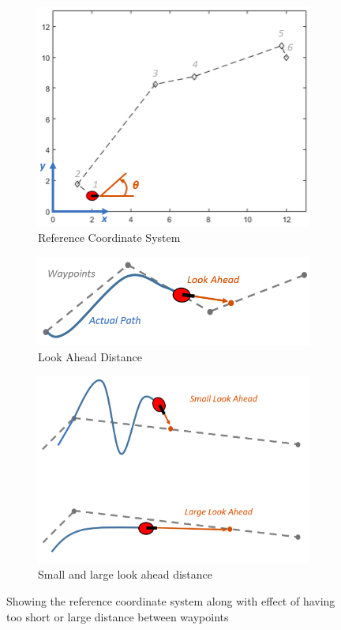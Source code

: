 \documentclass{article}
\begin{document}
		\begin{figure}[!h]
		\centering
		\begin{subfigure}[b]{0.3\textwidth}
			\includegraphics[width=\textwidth]{fig/fig5.png}
			\caption{Reference Coordinate System}
			\label{fig:image1}
		\end{subfigure}
		\hfill
		\begin{subfigure}[b]{0.3\textwidth}
			\includegraphics[width=\textwidth]{fig/fig6.png}
			\caption{Look Ahead Distance}
			\label{fig:image2}
		\end{subfigure}
		\hfill
		\begin{subfigure}[b]{0.3\textwidth}
			\includegraphics[width=\textwidth]{fig/fig7.png}
			\caption{Small and large look ahead distance}
			\label{fig:image3}
		\end{subfigure}
		\caption{Showing the reference coordinate system along with effect of having too short or large distance between waypoints \cite{mathworks_pure_pursuit}}
		\label{fig:three_images}
	\end{figure}
\end{document}
